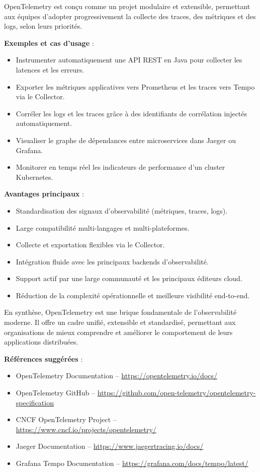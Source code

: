 OpenTelemetry est conçu comme un projet modulaire et extensible, permettant aux équipes d’adopter progressivement la collecte des traces, des métriques et des logs, selon leurs priorités.

\textbf{Exemples et cas d’usage} :
\begin{itemize}
	\item Instrumenter automatiquement une API REST en Java pour collecter les latences et les erreurs.
	\item Exporter les métriques applicatives vers Prometheus et les traces vers Tempo via le Collector.
	\item Corréler les logs et les traces grâce à des identifiants de corrélation injectés automatiquement.
	\item Visualiser le graphe de dépendances entre microservices dans Jaeger ou Grafana.
	\item Monitorer en temps réel les indicateurs de performance d’un cluster Kubernetes.
\end{itemize}

\textbf{Avantages principaux} :
\begin{itemize}
	\item Standardisation des signaux d’observabilité (métriques, traces, logs).
	\item Large compatibilité multi-langages et multi-plateformes.
	\item Collecte et exportation flexibles via le Collector.
	\item Intégration fluide avec les principaux backends d’observabilité.
	\item Support actif par une large communauté et les principaux éditeurs cloud.
	\item Réduction de la complexité opérationnelle et meilleure visibilité end-to-end.
\end{itemize}

En synthèse, OpenTelemetry est une brique fondamentale de l’observabilité moderne. Il offre un cadre unifié, extensible et standardisé, permettant aux organisations de mieux comprendre et améliorer le comportement de leurs applications distribuées.

\textbf{Références suggérées} :
\begin{itemize}
	\item OpenTelemetry Documentation – \url{https://opentelemetry.io/docs/}
	\item OpenTelemetry GitHub – \url{https://github.com/open-telemetry/opentelemetry-specification}
	\item CNCF OpenTelemetry Project – \url{https://www.cncf.io/projects/opentelemetry/}
	\item Jaeger Documentation – \url{https://www.jaegertracing.io/docs/}
	\item Grafana Tempo Documentation – \url{https://grafana.com/docs/tempo/latest/}
\end{itemize}

